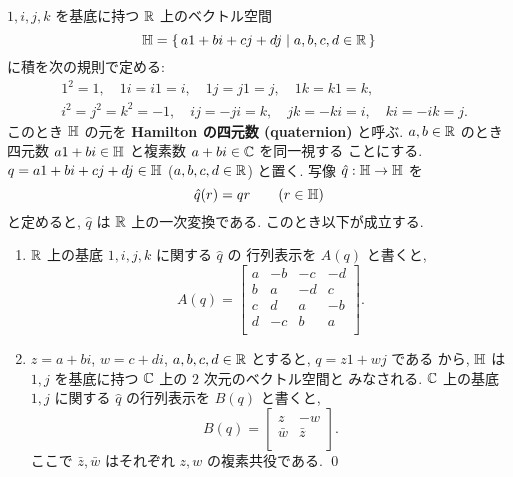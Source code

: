 \documentclass[12pt,twoside]{jarticle}
\begin{document}
\begin{question}
  $1,i,j,k$ を基底に持つ ${\mathbb R}$ 上のベクトル空間
  \begin{equation*}
    {\mathbb H} = \{\, a1 + bi + cj + dj \mid a,b,c,d\in{\mathbb R} \,\}
  \end{equation*}
  に積を次の規則で定める:
  \begin{align*}
    &
    1^2=1, \quad
    1i=i1=i, \quad 1j=j1=j, \quad 1k=k1=k, \quad 
    \\ &
    i^2=j^2=k^2=-1, \quad
    ij=-ji=k, \quad jk=-ki=i, \quad ki=-ik=j.
  \end{align*}
  このとき ${\mathbb H}$ の元を {\bf Hamilton の四元数 (quaternion)} と呼ぶ.
  $a,b\in{\mathbb R}$ のとき四元数 $a1+bi\in{\mathbb H}$ と複素数 $a+bi\in{\mathbb C}$ を同一視する
  ことにする.
  $q = a1 + bi + cj + dj\in{\mathbb H}$ ($a,b,c,d\in{\mathbb R}$) と置く.
  写像 $\hat{q}:{\mathbb H}\to{\mathbb H}$ を
  \begin{equation*}
    \hat{q}(r) = qr \qquad (r\in{\mathbb H})
  \end{equation*}
  と定めると, $\hat{q}$ は ${\mathbb R}$ 上の一次変換である.  このとき以下が成立する.
  \begin{enumerate}
  \item ${\mathbb R}$ 上の基底 $1,i,j,k$ に関する $\hat{q}$ の
    行列表示を $A(q)$ と書くと,
    \begin{equation*}
      A(q) = 
      \left[
      \begin{array}{rrrr}
        a & -b & -c & -d \\
        b &  a & -d &  c \\
        c &  d &  a & -b \\
        d & -c &  b &  a \\
      \end{array}
      \right].
    \end{equation*}
  \item $z=a+bi$, $w=c+di$, $a,b,c,d\in{\mathbb R}$ とすると, $q=z1+wj$ である
    から,  ${\mathbb H}$ は $1,j$ を基底に持つ ${\mathbb C}$ 上の $2$ 次元のベクトル空間と
    みなされる.  ${\mathbb C}$ 上の基底 $1,j$ に関する $\hat{q}$ の行列表示を $B(q)$ 
    と書くと,
    \begin{equation*}
      B(q) = 
      \begin{bmatrix}
        z       & -w \\
        \bar{w} & \bar{z} \\
      \end{bmatrix}.
    \end{equation*}
    ここで $\bar{z},\bar{w}$ はそれぞれ $z,w$ の複素共役である. \qed
  \end{enumerate}
\end{question}
\end{document}
